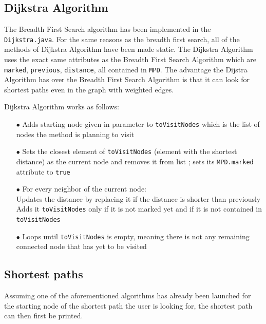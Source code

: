 \documentclass{article}
\begin{document}
\subsection{Dijkstra Algorithm}

The Breadth First Search algorithm has been implemented in the \texttt{Dijkstra.java}. For the same reasons as the breadth first search, all of the methods of Dijkstra Algorithm have been made static. The Dijkstra Algorithm uses the exact same attributes as the Breadth First Search Algorithm which are \texttt{marked}, \texttt{previous}, \texttt{distance}, all contained in \texttt{MPD}. The advantage the Dijstra Algorithm has over the Breadth First Search Algorithm is that it can look for shortest paths even in the graph with weighted edges.

Dijkstra Algorithm works as follows:

\begin{itemize}
\item[$\bullet$] Adds starting node given in parameter  to \texttt{toVisitNodes} which is the list of nodes the method is planning to visit
\item[$\bullet$] Sets the closest element of \texttt{toVisitNodes} (element with the shortest distance) as the current node and removes it from list ; sets its \texttt{MPD.marked} attribute to \texttt{true}
\item[$\bullet$] For every neighbor of the current node: 
\\ Updates the distance by replacing it if the distance is shorter than previously 
\\ Adds it \texttt{toVisitNodes} only if it is not marked yet and if it is not contained in \texttt{toVisitNodes}
\item[$\bullet$] Loops until \texttt{toVisitNodes} is empty, meaning there is not any remaining connected node that has yet to be visited
\end{itemize}

\subsection{Shortest paths}

Assuming one of the aforementioned algorithms has already been launched for the starting node of the shortest path the user is looking for, the shortest path can then first be printed.
\end{document}

